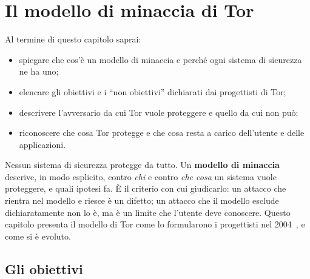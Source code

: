 \chapter{Il modello di minaccia di Tor}\label{cap:04-modello-minaccia}

\begin{obiettivi}
Al termine di questo capitolo saprai:
\begin{itemize}[nosep]
  \item spiegare che cos'è un modello di minaccia e perché ogni sistema di sicurezza ne ha uno;
  \item elencare gli obiettivi e i \enquote{non obiettivi} dichiarati dai progettisti di Tor;
  \item descrivere l'avversario da cui Tor vuole proteggere e quello da cui non può;
  \item riconoscere che cosa Tor protegge e che cosa resta a carico dell'utente e delle applicazioni.
\end{itemize}
\end{obiettivi}

Nessun sistema di sicurezza protegge da tutto. Un \textbf{modello di minaccia} descrive, in modo esplicito, contro \emph{chi} e contro \emph{che cosa} un sistema vuole proteggere, e quali ipotesi fa. È il criterio con cui giudicarlo: un attacco che rientra nel modello e riesce è un difetto; un attacco che il modello esclude dichiaratamente non lo è, ma è un limite che l'utente deve conoscere. Questo capitolo presenta il modello di Tor come lo formularono i progettisti nel 2004~\cite{dingledine2004tor}, e come si è evoluto.

\section{Gli obiettivi}\label{sec:minaccia-obiettivi}

